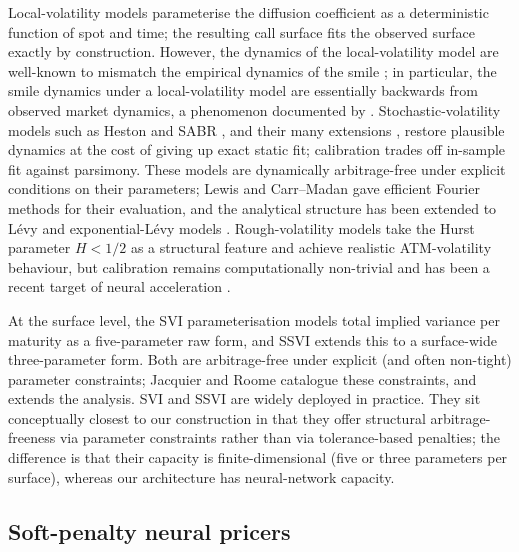 \documentclass[largeformat]{interact}
\let\cite\citep   %
\theoremstyle{plain}
\theoremstyle{definition}
\begin{document}
Local-volatility models \cite{dupire1994pricing} parameterise the diffusion coefficient as a deterministic function of spot and time; the resulting call surface fits the observed surface exactly by construction. However, the dynamics of the local-volatility model are well-known to mismatch the empirical dynamics of the smile \cite{cont2002dynamics}; in particular, the smile dynamics under a local-volatility model are essentially backwards from observed market dynamics, a phenomenon documented by \citet{hagan2002managing}. Stochastic-volatility models such as Heston \cite{heston1993closed} and SABR \cite{hagan2002managing}, and their many extensions \cite{andersen2007moment,andersen2008volatility,andersen2010interest}, restore plausible dynamics at the cost of giving up exact static fit; calibration trades off in-sample fit against parsimony. These models are dynamically arbitrage-free under explicit conditions on their parameters; Lewis \citeyearpar{lewis2001simple} and Carr--Madan \citeyearpar{carr1999fourier} gave efficient Fourier methods for their evaluation, and the analytical structure has been extended to L\'evy and exponential-L\'evy models \cite{carr2002fine,cont2003financial,eberlein2010analysis}. Rough-volatility models \cite{alos2007short,bayer2016pricing,bennedsen2017hybrid,bayer2023primer,euch2018perfect,jacquier2018vix} take the Hurst parameter $H < 1/2$ as a structural feature and achieve realistic ATM-volatility behaviour, but calibration remains computationally non-trivial and has been a recent target of neural acceleration \cite{horvath2021deepvol,bayer2019deep}.

At the surface level, the SVI parameterisation \cite{gatheral2004parsimonious} models total implied variance per maturity as a five-parameter raw form, and SSVI \cite{gatheral2014arbitrage} extends this to a surface-wide three-parameter form. Both are arbitrage-free under explicit (and often non-tight) parameter constraints; Jacquier and Roome \citeyearpar{jacquier2014arbitrage} catalogue these constraints, and \citet{gatheral2018volatility} extends the analysis. SVI and SSVI are widely deployed in practice. They sit conceptually closest to our construction in that they offer structural arbitrage-freeness via parameter constraints rather than via tolerance-based penalties; the difference is that their capacity is finite-dimensional (five or three parameters per surface), whereas our architecture has neural-network capacity.

\subsection{Soft-penalty neural pricers}
\label{sec:related-soft}
\end{document}
